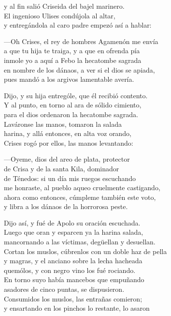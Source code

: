 y al fin salió Criseida del bajel marinero.\\
El ingenioso Ulises condújola al altar,\\
y entregándola al caro padre empezó así a hablar:\par
---Oh Crises, el rey de hombres Agamenón me envía\\
a que tu hija te traiga, y a que en ofrenda pía\\
inmole yo a aquí a Febo la hecatombe sagrada\\
en nombre de los dánaos, a ver si el dios se apiada,\\
pues mandó a los argivos lamentable avería.\par
Dijo, y su hija entrególe, que él recibió contento.\\
Y al punto, en torno al ara de sólido cimiento,\\
para el dios ordenaron la hecatombe sagrada.\\
Laváronse las manos, tomaron la salada\\
harina, y allá entonces, en alta voz orando,\\
Crises rogó por ellos, las manos levantando:\par
---Oyeme, dios del areo de plata, protector\\
de Crisa y de la santa Kila, dominador\\
de Ténedos: si un día mis ruegos escuchando\\
me honraste, al pueblo aqueo cruelmente castigando,\\
ahora como entonces, cúmpleme también este voto,\\
y libra a los dánaos de la horrorosa peste.\par
Dijo así, y fué de Apolo su oración escuchada.\\
Luego que oran y esparcen ya la harina salada,\\
mancornando a las víctimas, degüellan y desuellan.\\
Cortan los muslos, cúbrenlos con un doble haz de pella\\
y magras, y el anciano sobre la lecha hacheada\\
quemólos, y con negro vino los fué rociando.\\
En torno suyo había mancebos que empuñando\\
asadores de cinco puntas, se dispusieron.\\
Consumidos los muslos, las entrañas comieron;\\
y ensartando en los pinchos lo restante, lo asaron\\
